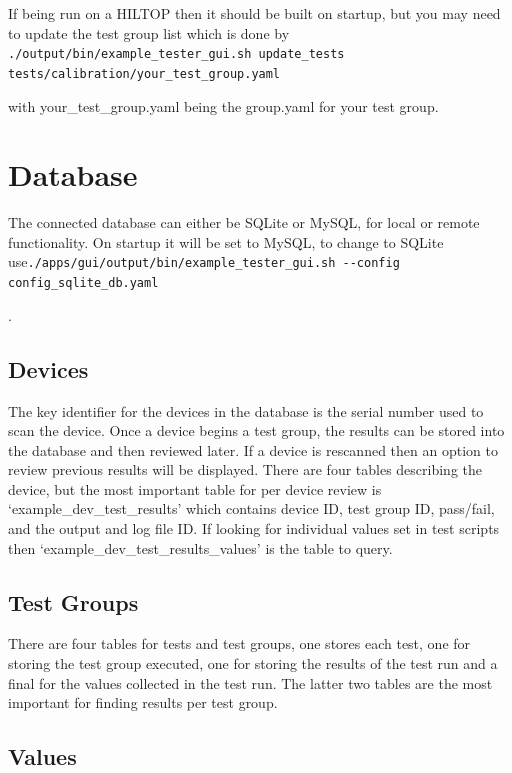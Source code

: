 \documentclass[a4paper,12pt, notitlepage]{article}
\begin{document}
{{{{{{{{{{{{{{{If being run on a HILTOP then it should be built on startup, but you may need to update the test group list which is done by \lstinline{./output/bin/example_tester_gui.sh update_tests tests/calibration/your_test_group.yaml}{ with your\_test\_group.yaml being the group.yaml for your test group.

\newpage
\section{Database}
\label{sec: Database}

The connected database can either be SQLite or MySQL, for local or remote functionality. On startup it will be set to MySQL, to change to SQLite use\newline \lstinline{./apps/gui/output/bin/example_tester_gui.sh --config config_sqlite_db.yaml}{.

\subsection{Devices}
\label{ssec: devicesDatabase}

The key identifier for the devices in the database is the serial number used to scan the device. Once a device begins a test group, the results can be stored into the database and then reviewed later. If a device is rescanned then an option to review previous results will be displayed. There are four tables describing the device, but the most important table for per device review is `example\_dev\_test\_results' which contains device ID, test group ID, pass/fail, and the output and log file ID. If looking for individual values set in test scripts then `example\_dev\_test\_results\_values' is the table to query. 

\subsection{Test Groups}
\label{ssec: testsDatabase}

There are four tables for tests and test groups, one stores each test, one for storing the test group executed, one for storing the results of the test run and a final for the values collected in the test run. The latter two tables are the most important for finding results per test group. 

\subsection{Values}
\label{ssec: valuesDatabase}

}}}}}}}}}}}}}}}}}
\end{document}
